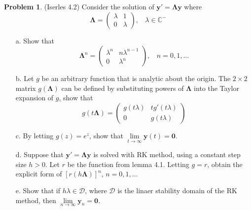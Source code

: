 \documentclass[a4paper, 10pt]{article}
\theoremstyle{definition}
\newtheorem{problem}{Problem}
\theoremstyle{hSol}
\begin{document}
\begin{problem} (Iserles 4.2) Consider the solution of $\bm{y}'=\bm{\Lambda} \bm{y}$ where 
$$
\bm{\Lambda} = \begin{pmatrix}
  \lambda & 1\\
  0 & \lambda
\end{pmatrix}, ~~~~\lambda \in \mathbb{C}^-
$$
\begin{itemize}
  \item[a.] Show that 
  $$
  \bm{\Lambda}^n = \begin{pmatrix}
    \lambda^n & n \lambda^{n-1} \\
    0 & \lambda^n
  \end{pmatrix},~~~~ n = 0,1,...
  $$
  \item[b.] Let $g$ be an arbitrary function that is analytic about the origin. The $2\times2$ matrix $g(\bm{\Lambda})$ can be defined by substituting powers of $\bm{\Lambda}$ into the Taylor expansion of $g$, show that
  $$
  g(t \bm{\Lambda}) = \begin{pmatrix}
    g(t \lambda) & tg'(t \lambda) \\
    0 & g(t \lambda)
  \end{pmatrix}
  $$
  \item[c.] By letting $g(z) = e^z$, show that $\lim\limits_{t\rightarrow\infty}\bm{y}(t)=\bm{0}$.
  \item[d.] Suppose that $\bm{y}'= \bm{\Lambda} \bm{y}$ is solved with RK method, using a constant step size $h>0$. Let $r$ be the function from lemma 4.1. Letting $g=r$, obtain the explicit form of $[r(h \bm{\Lambda})]^n$, $n=0,1,...$
  \item[e.] Show that if $h \lambda \in \mathcal{D}$, where $\mathcal{D}$ is the linaer stability domain of the RK method, then $\lim\limits_{n\rightarrow\infty} \bm{y}_n = \bm{0}$.
\end{itemize}
\end{problem}
\end{document}
